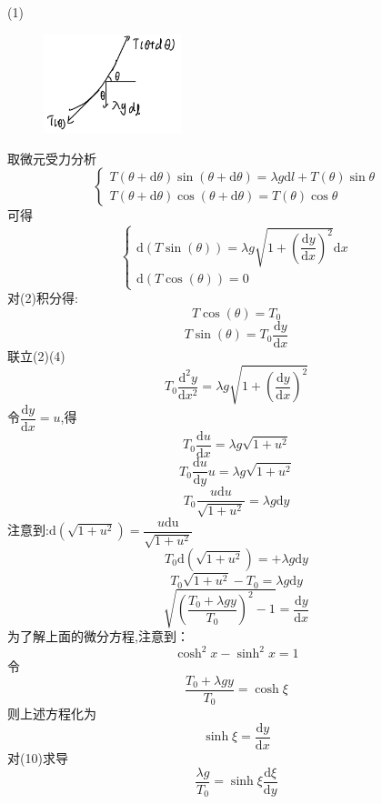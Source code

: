 \documentclass{article}
\begin{document}
\[\]
(1)
\par
\begin{figure}
	\vspace{-15pt}    %
	\includegraphics[width=4cm]{img/2.2.jpeg}\\
	\vspace{-15pt}    %
	\caption{}
	\vspace{-15pt}    %
\end{figure}
取微元受力分析
\[
\begin{cases}
    T\left( \theta +\mathrm{d}\theta \right) \sin \left( \theta +\mathrm{d}\theta \right) = \lambda g\mathrm{d}l+T(\theta)\sin \theta \\
    T\left( \theta +\mathrm{d}\theta \right) \cos \left( \theta +\mathrm{d}\theta \right) =T(\theta)\cos \theta 
\end{cases}
\tag{1}
\]
可得
\[
\begin{cases}
\mathrm{d}(T\sin(\theta))=\lambda g \sqrt{1+\left(\dfrac{\mathrm{d}y}{\mathrm{d}x}\right)^2}\mathrm{d}x\\
\mathrm{d}(T\cos(\theta))=0
\end{cases}
\tag{2}
\]
对(2)积分得:
\[
T\cos(\theta)=T_0
\tag{3}
\]
\[
T\sin(\theta)=T_0\dfrac{\mathrm{d}y}{\mathrm{d}x} 
\tag{4}
\]
联立(2)(4)
\[
T_{0}\dfrac{\mathrm{d}^{2}y}{\mathrm{d}x^{2}}=\lambda g\sqrt{1+\left(\dfrac{\mathrm{d}y}{\mathrm{d}x}\right)^2}
\tag{5}
\]
令$\dfrac{\mathrm{d}y}{\mathrm{d}x}=u$,得
\[
T_{0}\dfrac{\mathrm{d}u}{\mathrm{d}x}=\lambda g\sqrt{1+u^{2}}
\tag{6}
\]
\[
T_{0}\dfrac{\mathrm{d}u}{\mathrm{d}y}u=\lambda g\sqrt{1+u^{2}}
\tag{7}
\]
\[
T_{0}\dfrac{u\mathrm{d}u}{\sqrt{1+u^{2}}}=\lambda g\mathrm{d}y
\tag{8}
\]
注意到:$\mathrm{d}\left( \sqrt{1+u^{2}}\right) =\dfrac{u\mathrm{du}}{\sqrt{1+u^{2}}}$
\[
    T_0\mathrm{d}\left( \sqrt{1+u^{2}}\right) = +\lambda g\mathrm{d}y
\]
\[
    T_{0}\sqrt{1+u^{2}}-T_{0}=\lambda g\mathrm{d}y
\]
\[
    \sqrt{\left( \dfrac{T_{0}+\lambda gy}{T_{0}}\right) ^{2}-1}=\dfrac{\mathrm{d}y}{\mathrm{d}x}
\]
为了解上面的微分方程,注意到：
\[
\cosh^2 x-\sinh^2 x=1
\tag{9}
\]
令
\[
\dfrac{T_{0}+\lambda gy}{T_{0}}=\cosh \xi 
\tag{10}
\]
则上述方程化为
\[
\sinh \xi=\dfrac{\mathrm{d}y}{\mathrm{d}x}
\tag{11}
\]
对(10)求导
\[
\dfrac{\lambda g}{T_{0}}=\sinh \xi\dfrac{\mathrm{d}\xi}{\mathrm{d}y}
\tag{12}
\]
\end{document}
